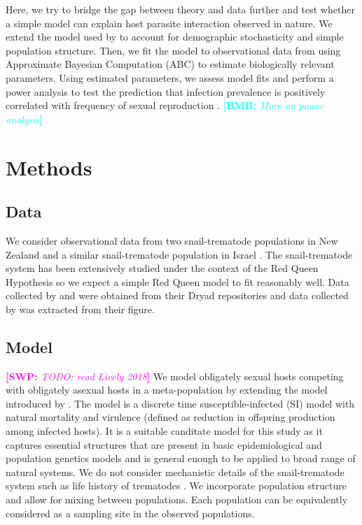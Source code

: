 \documentclass{article}\usepackage[]{graphicx}\usepackage[]{color}
\newcommand{\comment}[3]{\textcolor{#1}{\textbf{[#2: }\textit{#3}\textbf{]}}}
\newcommand{\bmb}[1]{\comment{cyan}{BMB}{#1}}
\newcommand{\swp}[1]{\comment{magenta}{SWP}{#1}}
\begin{document}
Here, we try to bridge the gap between theory and data further and test whether a simple model can explain host parasite interaction observed in nature.
We extend the model used by \cite{lively2010epidemiological} to account for demographic stochasticity and simple population structure.
Then, we fit the model to observational data from \cite{dagan2013clonal, mckone2016fine, vergara2014infection} using Approximate Bayesian Computation (ABC) to estimate biologically relevant parameters.
Using estimated parameters, we assess model fits and perform a power analysis to test the prediction that infection prevalence is positively correlated with frequency of sexual reproduction \cite{lively2001trematode}.
\bmb{More on power analysis}

\section{Methods}

\subsection{Data}

We consider observational data from two snail-trematode populations in New Zealand \citep{vergara2014infection, mckone2016fine} and a similar snail-trematode population in Israel \citep{dagan2013clonal}. 
The snail-trematode system has been extensively studied under the context of the Red Queen Hypothesis so we expect a simple Red Queen model to fit reasonably well.
Data collected by \cite{dagan2013clonal} and \cite{vergara2014infection} were obtained from their Dryad repositories \citep{dryad_f5t56, dryad_29nk3_2} and data collected by \cite{mckone2016fine} was extracted from their figure.

\subsection{Model}

\swp{TODO: read Lively 2018}
We model obligately sexual hosts competing with obligately asexual hosts in a meta-population by extending the model introduced by \cite{lively2010epidemiological}.
The model is a discrete time susceptible-infected (SI) model with natural mortality and virulence (defined as reduction in offspring production among infected hosts).
It is a suitable canditate model for this study as it captures essential structures that are present in basic epidemiological and population genetics models and is general enough to be applied to broad range of natural systems.
We do not consider mechanistic details of the snail-trematode system such as life history of trematodes \citep{vergara2014infection}.
We incorporate population structure and allow for mixing between populations.
Each population can be equivalently considered as a sampling site in the observed populations.
\end{document}
